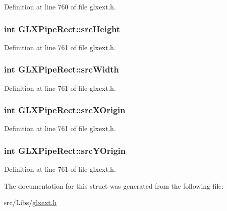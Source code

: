 Definition at line 760 of file glxext.h.

\hypertarget{struct_g_l_x_pipe_rect_a35632524bce6bffa05f284a9b1c1b8ff}{
\subsubsection[{srcHeight}]{\setlength{\rightskip}{0pt plus 5cm}int {\bf GLXPipeRect::srcHeight}}}
\label{struct_g_l_x_pipe_rect_a35632524bce6bffa05f284a9b1c1b8ff}


Definition at line 761 of file glxext.h.

\hypertarget{struct_g_l_x_pipe_rect_a2c6c180a4dabb71076366e06a1c7d0ef}{
\subsubsection[{srcWidth}]{\setlength{\rightskip}{0pt plus 5cm}int {\bf GLXPipeRect::srcWidth}}}
\label{struct_g_l_x_pipe_rect_a2c6c180a4dabb71076366e06a1c7d0ef}


Definition at line 761 of file glxext.h.

\hypertarget{struct_g_l_x_pipe_rect_a9df2313c01f75d149e64f2ff467bc266}{
\subsubsection[{srcXOrigin}]{\setlength{\rightskip}{0pt plus 5cm}int {\bf GLXPipeRect::srcXOrigin}}}
\label{struct_g_l_x_pipe_rect_a9df2313c01f75d149e64f2ff467bc266}


Definition at line 761 of file glxext.h.

\hypertarget{struct_g_l_x_pipe_rect_a1f7316dff7050ab2ce9d3d37f8c5450e}{
\subsubsection[{srcYOrigin}]{\setlength{\rightskip}{0pt plus 5cm}int {\bf GLXPipeRect::srcYOrigin}}}
\label{struct_g_l_x_pipe_rect_a1f7316dff7050ab2ce9d3d37f8c5450e}


Definition at line 761 of file glxext.h.



The documentation for this struct was generated from the following file:\begin{DoxyCompactItemize}
\item 
src/Libs/\hyperlink{glxext_8h}{glxext.h}\end{DoxyCompactItemize}
